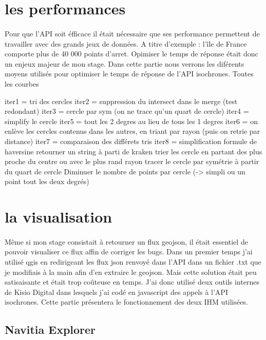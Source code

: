 \documentclass[a4paper]{report}
\begin{document}
\section{les performances}

\paragraph{}Pour que l'API soit éfficace il était nécessaire que ses performance permettent de travailler avec des grands jeux de données. A titre d'exemple : l'île de France comporte plus de 40 000 points d'arret. Opimiser le temps de réponse était donc un enjeux majeur de mon stage. Dans cette partie nous verrons les diférents moyens utilisés pour optimiser le temps de réponse de l'API isochrones. 
Toutes les courbes 

iter1 = tri des cercles
iter2 = suppression du intersect dans le merge (test redondant)
iter3 = cercle par sym (on ne trace qu'un quart de cercle)
iter4 = simplify le cercle
iter5 = tout les 2 degres au lieu de tous les 1 degres
iter6 = on enlève les cercles contenus dans les autres, en triant par rayon (puis on retrie par distance)
iter7 = comparaison des différets tris
iter8 = simplification formule de haversine
retourner un string à parti de kraken
trier les cercle en partant des plus proche du centre ou avec le plus rand rayon
tracer le cercle par symétrie à partir du quart de cercle
Diminuer le nombre de points par cercle (-> simpli ou un point tout les deux degrés)

\section{la visualisation}

\paragraph{} Même si mon stage consistait à retourner un flux geojson, il était essentiel de pouvoir visualiser ce flux affin de corriger les bugs. Dans un premier temps j'ai utilisé qgis en redirigeant les flux json renvoyé dans l'API dans un fichier .txt que je modifiais à la main afin d'en extraire le geojson. Mais cette solution était peu satisaisante et était trop coûteuse en temps. J'ai donc utilisé deux outils internes de Kisio Digital dans lesquels j'ai codé en javascript des appels à l'API isochrones. Cette partie présentera le fonctionnement des deux IHM utilisées.

\subsection{Navitia Explorer}
\end{document}
